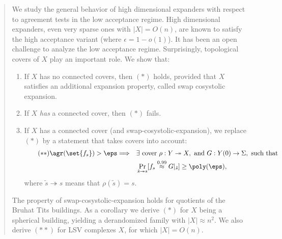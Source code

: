 \documentclass{article}[11pt]
\begin{document}
\begin{abstract}
%
We study the general behavior of high dimensional expanders with respect to agreement tests in the low acceptance regime. High dimensional expanders, even  very sparse ones with $|X|=O(n)$, are known to satisfy the high acceptance variant (where $\epsilon =1-o(1)$). It has been an open challenge to analyze the low acceptance regime. 
%
Surprisingly, topological covers of $X$ play an important role. We show that:
\begin{enumerate}
    \item If $X$ has no connected covers, then $(*)$ holds, provided that $X$ satisfies an additional expansion property, called swap cosystolic expansion.  
    \item If $X$ {\em has} a connected cover, then $(*)$  fails. 
    \item If $X$ has a connected cover (and swap-cosystolic-expansion), 
    we replace $(*)$ by a statement that takes covers into account:
    \begin{align*}\tag{$**$}
        \agr(\set{f_s})> \eps\Longrightarrow \quad &\exists \hbox{ cover }\rho:Y\twoheadrightarrow X,\hbox{ and }G:Y(0)\to\Sigma, \hbox{ such that }\\ 
   &\Pr_{{\tilde s\twoheadrightarrow s}}[f_s \overset{0.99}{\approx} G|_{\tilde s}] \geq\poly(\eps),
    \end{align*} where ${\tilde s\twoheadrightarrow s}$ means that $\rho(\tilde s)=s$. 
    \end{enumerate} 
    The property of swap-cosystolic-expansion holds for quotients of the Bruhat Tits buildings. As a corollary we derive $(*)$ for $X$ being a spherical building, yielding a derandomized family with $|X| \approx n^2$.
    We also derive $(**)$ for LSV complexes $X$, for which $|X|=O(n)$. 
\end{abstract}
\end{document}

